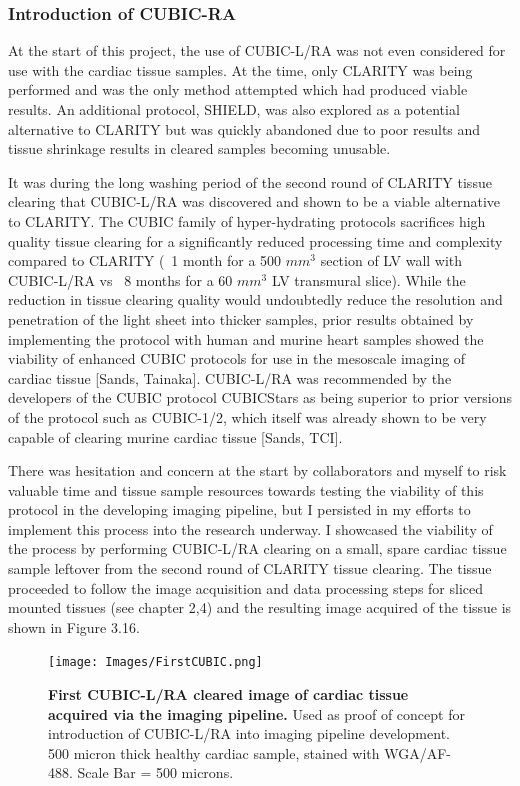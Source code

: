 \subsubsection{Introduction of CUBIC-RA}
At the start of this project, the use of CUBIC-L/RA was not even considered for use with the cardiac tissue samples. At the time, only CLARITY was being performed and was the only method attempted which had produced viable results. An additional protocol, SHIELD, was also explored as a potential alternative to CLARITY but was quickly abandoned due to poor results and tissue shrinkage results in cleared samples becoming unusable. 

It was during the long washing period of the second round of CLARITY tissue clearing that CUBIC-L/RA was discovered and shown to be a viable alternative to CLARITY. The CUBIC family of hyper-hydrating protocols sacrifices high quality tissue clearing for a significantly reduced processing time and complexity compared to CLARITY (~1 month for a 500 $mm^3$ section of LV wall with CUBIC-L/RA vs ~8 months for a 60 $mm^3$ LV transmural slice). While the reduction in tissue clearing quality would undoubtedly reduce the resolution and penetration of the light sheet into thicker samples, prior results obtained by implementing the protocol with human and  murine heart samples showed the viability of enhanced CUBIC protocols for use in the mesoscale imaging of cardiac tissue [Sands, Tainaka]. CUBIC-L/RA was recommended by the developers of the CUBIC protocol CUBICStars as being superior to prior versions of the protocol such as CUBIC-1/2, which itself was already shown to be very capable of clearing murine cardiac tissue [Sands, TCI]. 

There was hesitation and concern at the start by collaborators and myself to risk valuable time and tissue sample resources towards testing the viability of this protocol in the developing imaging pipeline, but I persisted in my efforts to implement this process into the research underway. I showcased the viability of the process by performing CUBIC-L/RA clearing on a small, spare cardiac tissue sample leftover from the second round of CLARITY tissue clearing. The tissue proceeded to follow the image acquisition and data processing steps for sliced mounted tissues (see chapter 2,4) and the resulting image acquired of the tissue is shown in Figure 3.16.

\begin{figure}[H]
    \centering
    \texttt{[image: Images/FirstCUBIC.png]}
    \caption{\textbf{First CUBIC-L/RA cleared image of cardiac tissue acquired via the imaging pipeline.} Used as proof of concept for introduction of CUBIC-L/RA into imaging pipeline development. 500 micron thick healthy cardiac sample, stained with WGA/AF-488. Scale Bar = 500 microns.}
    \label{fig:enter-label}
\end{figure}

